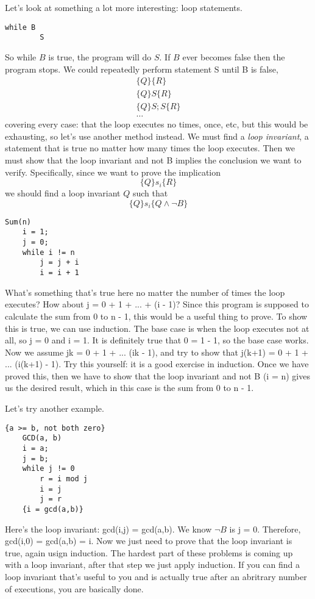 \documentclass[nobib]{tufte-handout}
\begin{document}
Let's look at something a lot more interesting: loop statements. 
\begin{lstlisting}[caption=Loop]
    while B
        S
\end{lstlisting}
So while $B$ is true, the program will do $S$. 
If $B$ ever becomes false then the program stops. 
We could repeatedly perform statement S until B is false, 
\begin{align*}
    \{Q\}\{R\} \\
    \{Q\}S\{R\} \\
    \{Q\}S;S\{R\} \\
    \dots
\end{align*}
covering every case: that the loop executes no times, once, etc, 
but this would be exhausting, so let's use another method instead. 
We must find a \emph{loop invariant}, a statement that is true no matter 
how many times the loop executes. Then we must show that the loop invariant and 
not B implies the conclusion we want to verify. 
Specifically, since we want to prove the implication 
\[\{Q\}s_i\{R\}\]
we should find a loop invariant $Q$ such that 
\[\{Q\}s_i\{Q \land \neg B\}\]
\begin{lstlisting}[caption=Loop invariant]
    Sum(n)
    i = 1;
    j = 0;
    while i != n 
        j = j + i
        i = i + 1
\end{lstlisting}
What's something that's true here no matter the number of times the loop
executes? How about j = 0 + 1 + ... + (i - 1)? Since this program 
is supposed to calculate the sum from 0 to n - 1, this would 
be a useful thing to prove. To show this is true, 
we can use induction. The base case is when the loop executes not at all, 
so j = 0 and i = 1. It is definitely true that 0 = 1 - 1, so the base 
case works. Now we assume jk = 0 + 1 + ... (ik - 1), and try to show 
that j(k+1) = 0 + 1 + ... (i(k+1) - 1). Try this yourself: it is a good exercise 
in induction. Once we have proved this, then we have to show that the loop 
invariant and not B (i = n) gives us the desired result, which in this case 
is the sum from 0 to n - 1. 

Let's try another example. 
\begin{lstlisting}[caption=Loop invariant example]
    {a >= b, not both zero}
    GCD(a, b)
    i = a;
    j = b;
    while j != 0
        r = i mod j 
        i = j 
        j = r 
    {i = gcd(a,b)}
\end{lstlisting}
Here's the loop invariant: gcd(i,j) = gcd(a,b). We know $\neg B$ 
is j = 0. Therefore, gcd(i,0) = gcd(a,b) = i. Now we just need 
to prove that the loop invariant is true, again usign induction. 
The hardest part of these problems is coming up with a loop invariant, 
after that step we just apply induction. If you can find a loop invariant 
that's useful to you and is actually true after an abritrary number of 
executions, you are basically done. 
\end{document}
